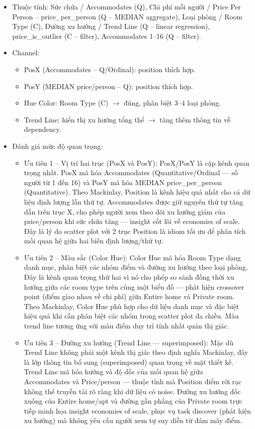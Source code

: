 \begin{itemize}
    \item Thuộc tính: Sức chứa / Accommodates (Q), Chi phí mỗi người / Price Per Person -- price\_per\_person (Q -- MEDIAN aggregate), Loại phòng / Room Type (C), Đường xu hướng / Trend Line (Q -- linear regression), price\_is\_outlier (C -- filter), Accommodates 1--16 (Q -- filter).
    \item Channel:
    \begin{itemize}
        \item PosX (Accommodates -- Q/Ordinal): position thích hợp.
        \item PosY (MEDIAN price/person -- Q): position thích hợp.
        \item Hue Color: Room Type (C) $\rightarrow$ đúng, phân biệt 3--4 loại phòng.
        \item Trend Line: hiển thị xu hướng tổng thể $\rightarrow$ tăng thêm thông tin về dependency.
    \end{itemize}
    \item Đánh giá mức độ quan trọng:
    \begin{itemize}
        \item Ưu tiên 1 -- Vị trí hai trục (PosX và PosY): PosX/PosY là cặp kênh quan trọng nhất. PosX mã hóa Accommodates (Quantitative/Ordinal --- số người từ 1 đến 16) và PosY mã hóa MEDIAN price\_per\_person (Quantitative). Theo Mackinlay, Position là kênh hiệu quả nhất cho cả dữ liệu định lượng lẫn thứ tự. Accommodates được giữ nguyên thứ tự tăng dần trên trục X, cho phép người xem theo dõi xu hướng giảm của price/person khi sức chứa tăng --- insight cốt lõi về economies of scale. Đây là lý do scatter plot với 2 trục Position là idiom tối ưu để phân tích mối quan hệ giữa hai biến định lượng/thứ tự.
        \item Ưu tiên 2 -- Màu sắc (Color Hue): Color Hue mã hóa Room Type dạng danh mục, phân biệt các nhóm điểm và đường xu hướng theo loại phòng. Đây là kênh quan trọng thứ hai vì nó cho phép so sánh đồng thời xu hướng giữa các room type trên cùng một biểu đồ --- phát hiện crossover point (điểm giao nhau về chi phí) giữa Entire home và Private room. Theo Mackinlay, Color Hue phù hợp cho dữ liệu danh mục và đặc biệt hiệu quả khi cần phân biệt các nhóm trong scatter plot đa chiều. Màu trend line tương ứng với màu điểm duy trì tính nhất quán thị giác.
        \item Ưu tiên 3 -- Đường xu hướng (Trend Line --- superimposed): Mặc dù Trend Line không phải một kênh thị giác theo định nghĩa Mackinlay, đây là lớp thông tin bổ sung (superimposed) quan trọng về mặt thiết kế. Trend Line mã hóa hướng và độ dốc của mối quan hệ giữa Accommodates và Price/person --- thuộc tính mà Position điểm rời rạc không thể truyền tải rõ ràng khi dữ liệu có noise. Đường xu hướng dốc xuống của Entire home/apt và đường gần phẳng của Private room trực tiếp minh họa insight economies of scale, phục vụ task discover (phát hiện xu hướng) mà không yêu cầu người xem tự suy diễn từ đám mây điểm.

\end{itemize}
\end{itemize}
